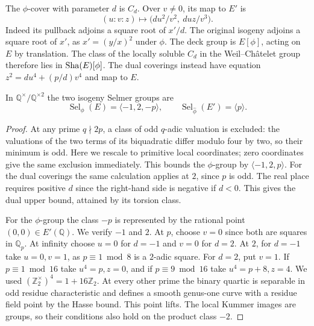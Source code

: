 \documentclass[11pt]{article}
\newcommand{\Q}{\mathbb Q}\newcommand{\Z}{\mathbb Z}\newcommand{\F}{\mathbb F}
\DeclareMathOperator{\Sel}{Sel}\DeclareMathOperator{\Br}{Br}
\begin{document}
The $\phi$-cover with parameter $d$ is $C_d$. Over $v\ne0$, its map to $E'$ is
\[
 (u:v:z)\longmapsto
 \bigl(d u^2/v^2,\ d u z/v^3\bigr).
\]
Indeed its pullback adjoins a square root of $x'/d$. The original isogeny adjoins a square root of $x'$, as $x'=(y/x)^2$ under $\phi$. The deck group is $E[\phi]$, acting on $E$ by translation. The class of the locally soluble $C_d$ in the Weil--Ch\^atelet group therefore lies in $\mathop{\mathrm{Sha}}\nolimits(E)[\phi]$.
The dual coverings instead have equation $z^2=d u^4+(p/d)v^4$ and map to $E$.

\begin{lemma}\label{local}
In $\Q^\times/\Q^{\times2}$ the two isogeny Selmer groups are
\[
 \Sel_\phi(E)=\langle-1,2,-p\rangle,\qquad
 \Sel_{\widehat\phi}(E')=\langle p\rangle .
\]
\end{lemma}
\begin{proof}
At any prime $q\nmid 2p$, a class of odd $q$-adic valuation is excluded: the valuations of the two terms of its biquadratic differ modulo four by two, so their minimum is odd. Here we rescale to primitive local coordinates; zero coordinates give the same exclusion immediately. This bounds the $\phi$-group by $\langle-1,2,p\rangle$. For the dual coverings the same calculation applies at $2$, since $p$ is odd. The real place requires positive $d$ since the right-hand side is negative if $d<0$. This gives the dual upper bound, attained by its torsion class.

For the $\phi$-group the class $-p$ is represented by the rational point $(0,0)\in E'(\Q)$. We verify $-1$ and $2$. At $p$, choose $v=0$ since both are squares in $\Q_p$. At infinity choose $u=0$ for $d=-1$ and $v=0$ for $d=2$. At $2$, for $d=-1$ take $u=0,v=1$, as $p\equiv1\bmod8$ is a $2$-adic square. For $d=2$, put $v=1$. If $p\equiv1\bmod16$ take $u^4=p,z=0$, and if $p\equiv9\bmod16$ take $u^4=p+8,z=4$. We used $(\Z_2^\times)^4=1+16\Z_2$. At every other prime the binary quartic is separable in odd residue characteristic and defines a smooth genus-one curve with a residue field point by the Hasse bound. This point lifts. The local Kummer images are groups, so their conditions also hold on the product class $-2$.
\end{proof}
\end{document}
